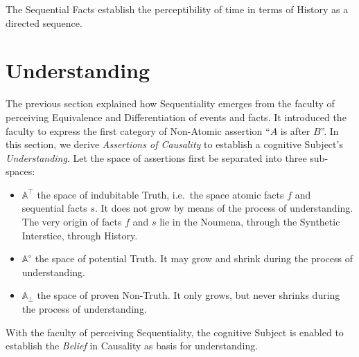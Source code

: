 \documentclass[11pt, a4paper]{article}
\theoremstyle{formalism}
\begin{document}
The Sequential Facts establish the perceptibility of time in terms of History
as a directed sequence. 

\section{Understanding}

The previous section explained how Sequentiality emerges from the faculty of
perceiving Equivalence and Differentiation of events and facts. It introduced
the faculty to express the first category of Non-Atomic assertion ``$A$ is
after $B$''. In this section, we derive {\it Assertions of Causality\/} to
establish a cognitive Subject's {\it Understanding}. Let the space of
assertions first be separated into three sub-spaces:

\begin{itemize}
    \item $\mathbb{A}^\top$ the space of indubitable Truth, i.e.\ the space 
       atomic facts $f$ and sequential facts $s$. It does not grow by means 
       of the process of understanding. The very origin of facts $f$ and $s$ 
       lie in the Noumena, through the Synthetic Interstice, through History.

    \item $\mathbb{A}^\diamond$ the space of potential Truth. It may grow
       and shrink during the process of understanding. 

    \item $\mathbb{A}_\bot$ the space of proven Non-Truth. It only grows,
       but never shrinks during the process of understanding.
\end{itemize}

With the faculty of perceiving Sequentiality, the cognitive Subject is enabled
to establish the {\it Belief\/} in Causality as basis for understanding.
\end{document}
